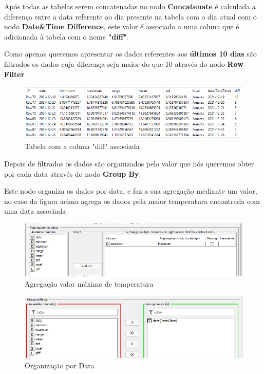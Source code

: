Após todas as tabelas serem concatenadas no nodo \textbf{Concatenate} é calculada a diferença entre a data referente ao dia presente na tabela com o dia atual com o nodo \textbf{Date\&Time Difference}, este valor é associado a uma coluna que é adicionada à tabela com o nome \textbf{"diff"}. 

Como apenas queremos apresentar os dados referentes aos \textbf{últimos 10 dias} são filtrados os dados cuja diferença seja maior do que 10 através do nodo \textbf{Row Filter}

\begin{figure}[H]
    \centering
    \includegraphics[scale=0.65]{imagens/tablediff.png}
    \caption{Tabela com a coluna "diff" associada}
\end{figure}


Depois de filtrados os dados são organizados pelo valor que nós queremos obter por cada data através do nodo \textbf{Group By}. 

Este nodo organiza os dados por data, e faz a sua agregação mediante um valor, no caso da figura acima agrega os dados pela maior temperatura encontrada com uma data associada

\begin{figure}[H]
    \centering
    \includegraphics[scale=0.67]{imagens/maiortemperaturaGroupBY.png}
    \caption{Agregação valor máximo de temperatura}
\end{figure}

\begin{figure}[H]
    \centering
    \includegraphics[scale=0.67]{imagens/dataGroupBY.png}
    \caption{Organização por Data}
\end{figure}


